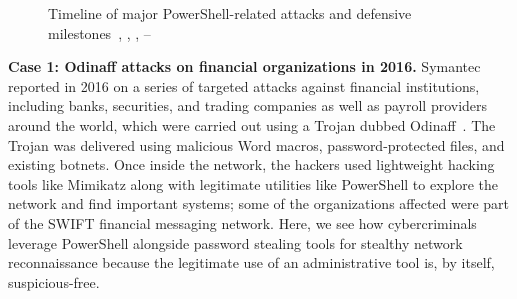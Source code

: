 \documentclass[12pt,a4paper]{article}
\newcommand{\head}[1]{\noindent\textbf{#1}\quad}
\begin{document}
\begin{figure}[!htb]
\centering
{}
\caption{Timeline of major PowerShell-related attacks and defensive milestones~\cite{wueest2016}, \cite{redcanary2025}, \cite{nsa2022}, \cite{symantec2016odinaff}--\cite{sophos2021}}\label{fig:timeline}
\end{figure}

\head{Case 1: Odinaff attacks on financial organizations in 2016.} Symantec reported in 2016 on a series of targeted attacks against financial institutions, including banks, securities, and trading companies as well as payroll providers around the world, which were carried out using a Trojan dubbed Odinaff~\cite{symantec2016odinaff}. The Trojan was delivered using malicious Word macros, password-protected files, and existing botnets. Once inside the network, the hackers used lightweight hacking tools like Mimikatz along with legitimate utilities like PowerShell to explore the network and find important systems; some of the organizations affected were part of the SWIFT financial messaging network. Here, we see how cybercriminals leverage PowerShell alongside password stealing tools for stealthy network reconnaissance because the legitimate use of an administrative tool is, by itself, suspicious-free.
\end{document}
